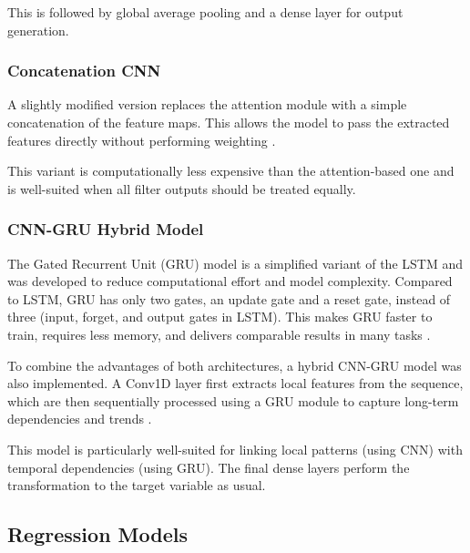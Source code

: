 This is followed by global average pooling and a dense layer for output generation.



\subsubsection{Concatenation CNN}

A slightly modified version replaces the attention module with a simple concatenation of the feature maps.
This allows the model to pass the extracted features directly without performing weighting \cite{keras-concat}.

This variant is computationally less expensive than the attention-based one and is well-suited when all filter outputs should be treated equally.



\subsubsection{CNN-GRU Hybrid Model}

The Gated Recurrent Unit (GRU) model is a simplified variant of the LSTM and was developed to reduce computational effort and model complexity.
Compared to LSTM, GRU has only two gates, an update gate and a reset gate, instead of three (input, forget, and output gates in LSTM).
This makes GRU faster to train, requires less memory, and delivers comparable results in many tasks \cite{gru-basics}.

To combine the advantages of both architectures, a hybrid CNN-GRU model was also implemented.
A Conv1D layer first extracts local features from the sequence, which are then sequentially processed using a GRU module to capture long-term dependencies and trends \cite{cnn-gru}.

This model is particularly well-suited for linking local patterns (using CNN) with temporal dependencies (using GRU).
The final dense layers perform the transformation to the target variable as usual.



\subsection{Regression Models}
\label{chap:regression-models}

